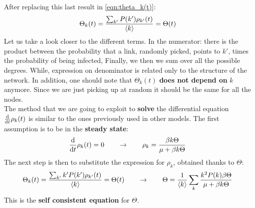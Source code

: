 \documentclass[../main/main.tex]{subfiles}
\begin{document}
After replacing this last result in \ref{eqn:theta_k(t)}:
\begin{equation*}
  \Theta _k (t) = \frac{\sum_{k'}^{} P(k') \rho _{k'} (t)  }{\expval{k} } = \Theta (t)
\end{equation*}
Let us take a look closer to the different terms. In the numerator: there is the product between the probability that a link, randomly picked, points to \( k' \), times the probability of being infected, Finally, we then we sum over all the possible degrees. While, expression on denominator is related only to the structure of the network. In addition, one should note that \( \Theta _k (t) \) \textbf{does not depend on} \( k \) anymore. Since we are just picking up at random it should be the same for all the nodes.\\

The method that we are going to exploit to \textbf{solve} the differential equation \( \dv{}{t} \rho _k (t) \) is similar to the ones previously used in other models. The first assumption is to be in the \textbf{steady state}:
\begin{equation*}
  \dv{}{t} \rho _k (t) = 0 \qquad \rightarrow  \qquad \rho _k = \frac{\beta k \Theta }{\mu + \beta k \Theta }
\end{equation*}
The next step is then to substitute the expression for \( \rho _k  \), obtained thanks to \( \Theta  \):
\begin{equation*}
    \Theta _k (t) = \frac{\sum_{k'}^{} k' P(k') \rho _{k'} (t)  }{\expval{k} } = \Theta (t) \qquad \rightarrow \qquad \Theta = \frac{1}{\expval{k} } \sum_{k}^{} \frac{k^2 P(k) \beta \Theta }{\mu + \beta k \Theta }
\end{equation*}
This is the \textbf{self consistent equation} for \( \Theta  \).

\medskip
\end{document}
